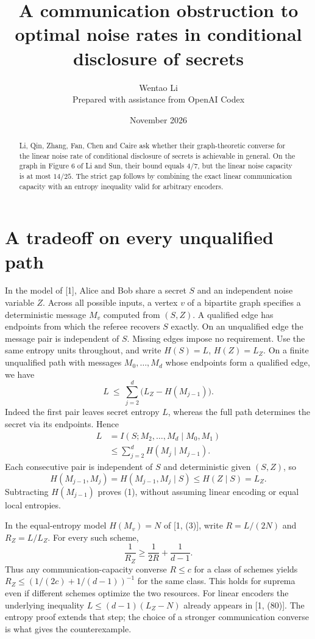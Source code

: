 \documentclass[11pt]{article}
\title{A communication obstruction to optimal noise rates in conditional disclosure of secrets}
\author{Wentao Li\\[2pt]\small Prepared with assistance from OpenAI Codex}
\date{November 2026}
\begin{document}
\maketitle
\begin{abstract}
Li, Qin, Zhang, Fan, Chen and Caire ask whether their graph-theoretic converse for the linear noise rate of conditional disclosure of secrets is achievable in general. On the graph in Figure 6 of Li and Sun, their bound equals $4/7$, but the linear noise capacity is at most $14/25$. The strict gap follows by combining the exact linear communication capacity with an entropy inequality valid for arbitrary encoders.
\end{abstract}

\section{A tradeoff on every unqualified path}
In the model of [1], Alice and Bob share a secret $S$ and an independent noise variable $Z$. Across all possible inputs, a vertex $v$ of a bipartite graph specifies a deterministic message $M_v$ computed from $(S,Z)$. A qualified edge has endpoints from which the referee recovers $S$ exactly. On an unqualified edge the message pair is independent of $S$. Missing edges impose no requirement. Use the same entropy units throughout, and write $H(S)=L$, $H(Z)=L_Z$. On a finite unqualified path with messages $M_0,\ldots,M_d$ whose endpoints form a qualified edge, we have
\[
 L\ \le\ \sum_{j=2}^d \bigl(L_Z-H(M_{j-1})\bigr).
 \tag{1}
\]
Indeed the first pair leaves secret entropy $L$, whereas the full path determines the secret via its endpoints. Hence
\begin{align*}
 L&= I(S;M_2,\ldots,M_d\mid M_0,M_1)\\
  &\le \sum_{j=2}^d H(M_j\mid M_{j-1}).
\end{align*}
Each consecutive pair is independent of $S$ and deterministic given $(S,Z)$, so
\[
 H(M_{j-1},M_j)=H(M_{j-1},M_j\mid S)\le H(Z\mid S)=L_Z.
\]
Subtracting $H(M_{j-1})$ proves (1), without assuming linear encoding or equal local entropies.

In the equal-entropy model $H(M_v)=N$ of [1, (3)], write $R=L/(2N)$ and $R_Z=L/L_Z$. For every such scheme,
\[
 \frac1{R_Z}\ge\frac1{2R}+\frac1{d-1}. \tag{2}
\]
Thus any communication-capacity converse $R\le c$ for a class of schemes yields $R_Z\le(1/(2c)+1/(d-1))^{-1}$ for the same class. This holds for suprema even if different schemes optimize the two resources. For linear encoders the underlying inequality $L\le(d-1)(L_Z-N)$ already appears in [1, (80)]. The entropy proof extends that step; the choice of a stronger communication converse is what gives the counterexample.
\end{document}
